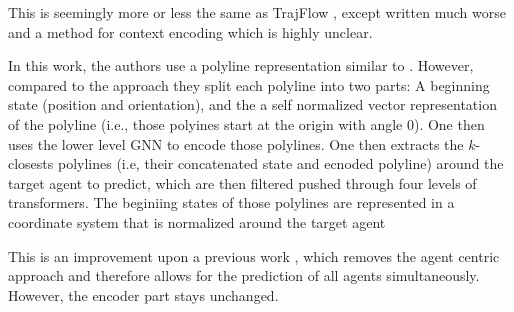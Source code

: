 \cite{stefani2024mapflow} This is seemingly more or less the same as TrajFlow \cite{meszaros2024trajflow}, except written much worse and a method for context encoding which is highly unclear.



\cite{tang2024hpnet} 



\cite{zhang2024real} In this work, the authors use a polyline representation similar to \cite{gao2020vectornet}. However, compared to the approach they split each polyline into two parts: A beginning state (position and orientation), and the a self normalized vector representation of the polyline (i.e., those polyines start at the origin with angle 0). One then uses the lower level GNN to encode those polylines. One then extracts the $k$-closests polylines (i.e, their concatenated state and ecnoded polyline) around the target agent to predict, which are then filtered pushed through four levels of transformers. The beginiing states of those polylines are represented in a coordinate system that is normalized around the target agent



\cite{shi2024mtr} This is an improvement upon a previous work \cite{shi2022motion}, which removes the agent centric approach and therefore allows for the prediction of all agents simultaneously. However, the encoder part stays unchanged.
